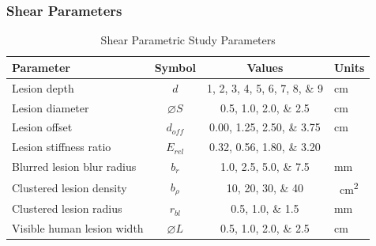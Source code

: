\documentclass{beamer}
\begin{document}
		\begin{frame}[label=shearParameters]
			\frametitle{Shear Parameters}
			\centering
			\scriptsize

			\begin{table}
				\caption{Shear Parametric Study Parameters}
				\begin{tabular}{lccs[table-unit-alignment = left]}
					\toprule
					Parameter & Symbol & Values & Units \\
					\midrule
					Lesion depth & $d$ & \numlist{1;2;3;4;5;6;7;8;9} & \si{\cm} \\
					Lesion diameter & $\diameter S$ & \numlist{0.5;1.0;2.0;2.5} & \si{\cm} \\
					Lesion offset & $d_{off}$ & \numlist{0.00;1.25;2.50;3.75} & \si{\cm} \\
					Lesion stiffness ratio & $E_{rel}$ & \numlist{0.32;0.56;1.80;3.20} & \\
					Blurred lesion blur radius & $b_r$ & \numlist{1.0;2.5;5.0;7.5} & \si{\mm} \\
					Clustered lesion density & $b_\rho$ & \numlist{10;20;30;40} & \si{\per\cm\squared} \\
					Clustered lesion radius & $r_{bl}$ & \numlist{0.5;1.0;1.5} & \si{\mm} \\
					Visible human lesion width & $\diameter L$ & \numlist{0.5;1.0;2.0;2.5} & \si{\cm} \\
					\bottomrule
				\end{tabular}
			\end{table}
		\end{frame}
\end{document}
